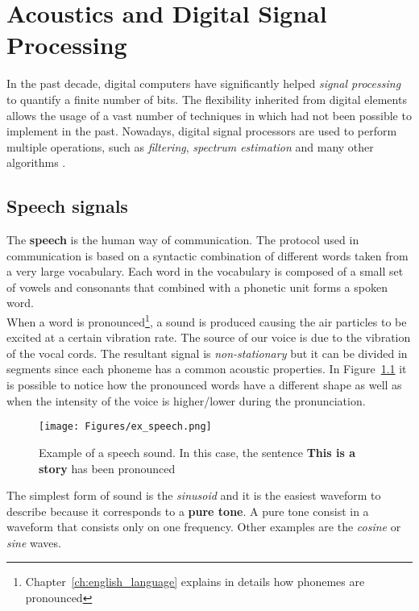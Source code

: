 
\chapter{Acoustics and Digital Signal Processing}
\label{ch:speech analysis}
In the past decade, digital computers have significantly helped \textit{signal processing} to quantify a finite number of bits. The flexibility inherited from digital elements allows the usage of a vast number of techniques in which had not been possible to implement in the past. Nowadays, digital signal processors are used to perform multiple operations, such as \textit{filtering}, \textit{spectrum estimation} and many other algorithms \cite{orfanidis1995introduction}.


\section{Speech signals}
\label{sec:speech_signals}
The \textbf{speech} is the human way of communication. The protocol used in communication is based on a syntactic combination of different words taken from a very large vocabulary. Each word in the vocabulary is composed of a small set of vowels and consonants that combined with a phonetic unit forms a spoken word. \\
\noindent When a word is pronounced\footnote{Chapter~\ref{ch:english_language} explains in details how phonemes are pronounced}, a sound is produced causing the air particles to be excited at a certain vibration rate. The source of our voice is due to the vibration of the vocal cords. The resultant signal is \textit{non-stationary} but it can be divided in segments since each phoneme has a common acoustic properties. In Figure~\ref{fig:ex_sound_wave} it is possible to notice how the pronounced words have a different shape as well as when the intensity of the voice is higher/lower during the pronunciation.

\begin{figure}[!ht]
	\centering
	\texttt{[image: Figures/ex\_speech.png]}
	\caption{Example of a speech sound. In this case, the sentence \textbf{This is a story} has been pronounced \cite{ex_speech_image}}
	\label{fig:ex_sound_wave}
\end{figure}

\noindent The simplest form of sound is the \textit{sinusoid} and it is the easiest waveform to describe because it corresponds to a \textbf{pure tone}. A pure tone consist in a waveform that consists only on one frequency. Other examples are the \textit{cosine} or \textit{sine} waves.

